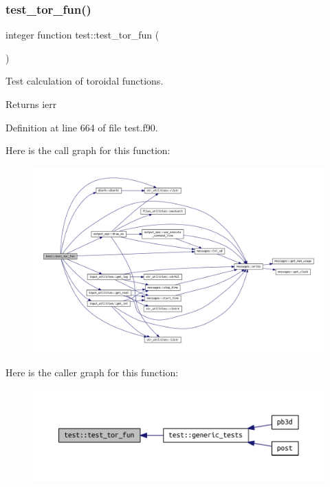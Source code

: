 \subsubsection{\texorpdfstring{test\+\_\+tor\+\_\+fun()}{test\_tor\_fun()}}
{\footnotesize\ttfamily integer function test\+::test\+\_\+tor\+\_\+fun (\begin{DoxyParamCaption}{ }\end{DoxyParamCaption})}



Test calculation of toroidal functions. 

\begin{DoxyReturn}{Returns}
ierr 
\end{DoxyReturn}


Definition at line 664 of file test.\+f90.

Here is the call graph for this function\+:\nopagebreak
\begin{figure}[H]
\begin{center}
\leavevmode
\includegraphics[width=350pt]{namespacetest_ab595ec935321ea0b1168593fb88fad22_cgraph}
\end{center}
\end{figure}
Here is the caller graph for this function\+:\nopagebreak
\begin{figure}[H]
\begin{center}
\leavevmode
\includegraphics[width=350pt]{namespacetest_ab595ec935321ea0b1168593fb88fad22_icgraph}
\end{center}
\end{figure}
